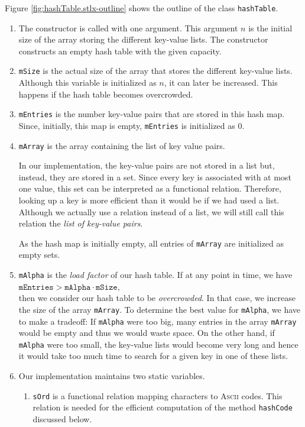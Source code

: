 Figure \ref{fig:hashTable.stlx-outline} shows the outline of the class \texttt{hashTable}.  
\begin{enumerate}
\item The constructor is called with one argument.  This argument $n$ is the initial size
      of the array storing the different key-value lists.  The constructor constructs an empty hash
      table with the given capacity.
\item \texttt{mSize} is the actual size of the array that stores the different key-value lists.
      Although this variable is initialized as $n$, it can later be increased.  This happens
      if the hash table becomes overcrowded.
\item \texttt{mEntries} is the number key-value pairs that are stored in this hash map.
      Since, initially, this map is empty, \texttt{mEntries} is  initialized as $0$.
\item \texttt{mArray} is the array containing the list of key value pairs.

      In our implementation, the key-value pairs are not stored in a list but, instead, they are
      stored in a set.  Since every key is associated with at most one value, this set can be interpreted as a
      functional relation.  Therefore, looking up a key is more efficient than it would be if we had
      used a list.  Although we actually use a relation instead of a list, we will still call
      this relation the \emph{list of key-value pairs}.

      As the hash map is initially empty, all entries of \texttt{mArray} are initialized as empty sets.
\item \texttt{mAlpha} is the \emph{load factor} of our hash table.  If at any point in time, we have
      \\[0.2cm]
      \hspace*{1.3cm}
      $\texttt{mEntries} > \texttt{mAlpha} \cdot \texttt{mSize}$,
      \\[0.2cm]
      then we consider our hash table to be \emph{overcrowded}.  In that case, we increase the size
      of the array \texttt{mArray}.  To determine the best value for \texttt{mAlpha}, we have to
      make a tradeoff:  If \texttt{mAlpha} were too big, many entries in the array \texttt{mArray}
      would be empty and thus we would waste space.  On the other hand, if \texttt{mAlpha} were too
      small, the key-value lists would become very long and hence it would take too much time to
      search for a given key in one of these lists.
\item Our implementation maintains two static variables.
  \begin{enumerate}
  \item \texttt{sOrd} is a functional relation mapping characters to \textsc{Ascii} codes.
        This relation is needed for the efficient computation of the method \texttt{hashCode}
        discussed below.


\end{enumerate}
\end{enumerate}
